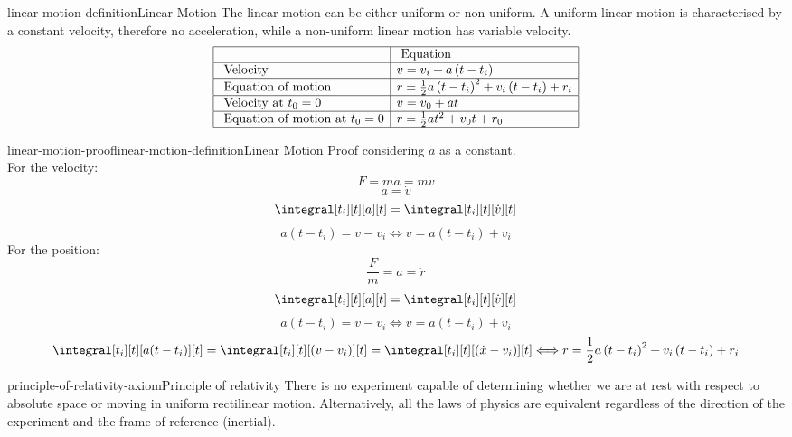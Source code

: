 \documentclass[preview]{standalone}
\begin{document}
\begin{snippetproposition}{linear-motion-definition}{Linear Motion}
    The linear motion can be either uniform or non-uniform. A uniform linear motion is characterised by a constant velocity, therefore no acceleration, while a non-uniform linear motion has variable velocity. \\
    $$ \begin{array}{|l|l|}
        \hline \text {  } & \text { Equation } \\
        \hline \text { Velocity } & v=v_i+a\left(t-t_i\right) \\
        \hline \text { Equation of motion } & r=\frac{1}{2} a\left(t-t_i\right)^2+v_i\left(t-t_i\right)+r_i \\
        \hline \text { Velocity at } t_0=0 & v=v_0+a t \\
        \hline \text { Equation of motion at } t_0=0 & r=\frac{1}{2} a t^2+v_0 t+r_0 \\
        \hline
    \end{array} $$
\end{snippetproposition}

\begin{snippetproof}{linear-motion-proof}{linear-motion-definition}{Linear Motion Proof}
    considering $a$ as a constant. \\
    For the velocity:
    $$ F = ma = m\dot{v} $$
    $$ a = \dot{v} $$
    $$ \integral[t_i][t][a][t] = \integral[t_i][t][\dot{v}][t] $$
    $$ a(t - t_i) = v - v_i \Longleftrightarrow v = a(t - t_i) + v_i $$
    For the position:
    $$ \frac{F}{m} = a = \ddot{r} $$
    $$ \integral[t_i][t][a][t] = \integral[t_i][t][\dot{v}][t] $$
    $$ a(t - t_i) = v - v_i \Longleftrightarrow v = a(t - t_i) + v_i $$ 
    $$ \integral[t_i][t][a(t - t_i)][t] = \integral[t_i][t][\left( v - v_i \right)][t] = \integral[t_i][t][\left( \dot{x} - v_i \right)][t] \Longleftrightarrow r=\frac{1}{2} a\left(t-t_i\right)^2+v_i\left(t-t_i\right)+r_i $$
\end{snippetproof}

\begin{snippetaxiom}{principle-of-relativity-axiom}{Principle of relativity}
    There is no experiment capable of determining whether we are at rest with respect to
    absolute space or moving in uniform rectilinear motion.
    Alternatively, all the laws of physics are equivalent regardless of the direction of the experiment
    and the frame of reference (inertial).
\end{snippetaxiom}
\end{document}
